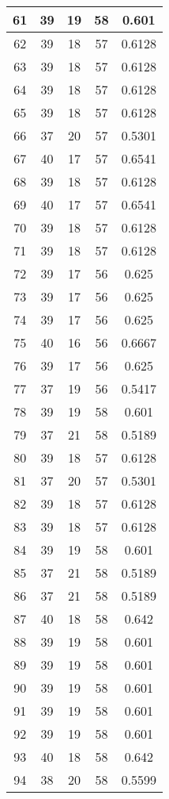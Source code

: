 \documentclass[letterpaper, 12pt]{article}
\begin{document}
\begin{longtable}{|c|c|c|c|c|}
\hline
61 & 39 & 19 & 58 & 0.601 \\
\hline
62 & 39 & 18 & 57 & 0.6128 \\
\hline
63 & 39 & 18 & 57 & 0.6128 \\
\hline
64 & 39 & 18 & 57 & 0.6128 \\
\hline
65 & 39 & 18 & 57 & 0.6128 \\
\hline
66 & 37 & 20 & 57 & 0.5301 \\
\hline
67 & 40 & 17 & 57 & 0.6541 \\
\hline
68 & 39 & 18 & 57 & 0.6128 \\
\hline
69 & 40 & 17 & 57 & 0.6541 \\
\hline
70 & 39 & 18 & 57 & 0.6128 \\
\hline
71 & 39 & 18 & 57 & 0.6128 \\
\hline
72 & 39 & 17 & 56 & 0.625 \\
\hline
73 & 39 & 17 & 56 & 0.625 \\
\hline
74 & 39 & 17 & 56 & 0.625 \\
\hline
75 & 40 & 16 & 56 & 0.6667 \\
\hline
76 & 39 & 17 & 56 & 0.625 \\
\hline
77 & 37 & 19 & 56 & 0.5417 \\
\hline
78 & 39 & 19 & 58 & 0.601 \\
\hline
79 & 37 & 21 & 58 & 0.5189 \\
\hline
80 & 39 & 18 & 57 & 0.6128 \\
\hline
81 & 37 & 20 & 57 & 0.5301 \\
\hline
82 & 39 & 18 & 57 & 0.6128 \\
\hline
83 & 39 & 18 & 57 & 0.6128 \\
\hline
84 & 39 & 19 & 58 & 0.601 \\
\hline
85 & 37 & 21 & 58 & 0.5189 \\
\hline
86 & 37 & 21 & 58 & 0.5189 \\
\hline
87 & 40 & 18 & 58 & 0.642 \\
\hline
88 & 39 & 19 & 58 & 0.601 \\
\hline
89 & 39 & 19 & 58 & 0.601 \\
\hline
90 & 39 & 19 & 58 & 0.601 \\
\hline
91 & 39 & 19 & 58 & 0.601 \\
\hline
92 & 39 & 19 & 58 & 0.601 \\
\hline
93 & 40 & 18 & 58 & 0.642 \\
\hline
94 & 38 & 20 & 58 & 0.5599 \\

\end{longtable}
\end{document}
